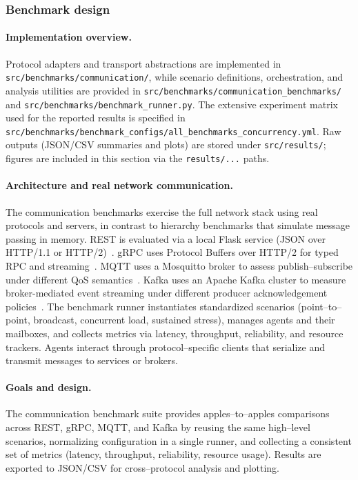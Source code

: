 \subsubsection{Benchmark design}

\paragraph{Implementation overview.}
Protocol adapters and transport abstractions are implemented in \texttt{src/benchmarks/communication/}, while scenario definitions, orchestration, and analysis utilities are provided in \texttt{src/benchmarks/communication\_benchmarks/} and \texttt{src/benchmarks/benchmark\_runner.py}. The extensive experiment matrix used for the reported results is specified in \texttt{src/benchmarks/benchmark\_configs/all\_benchmarks\_concurrency.yml}. Raw outputs (JSON/CSV summaries and plots) are stored under \texttt{src/results/}; figures are included in this section via the \texttt{results/...} paths.

\paragraph{Architecture and real network communication.}
The communication benchmarks exercise the full network stack using real protocols and servers, in contrast to hierarchy benchmarks that simulate message passing in memory. REST is evaluated via a local Flask service (JSON over HTTP/1.1 or HTTP/2)~\cite{Fielding2000REST,RFC9110}. gRPC uses Protocol Buffers over HTTP/2 for typed RPC and streaming~\cite{gRPCConcepts,gRPCProto}. MQTT uses a Mosquitto broker to assess publish--subscribe under different QoS semantics~\cite{MQTTv5Spec}. Kafka uses an Apache Kafka cluster to measure broker-mediated event streaming under different producer acknowledgement policies~\cite{apache_kafka_docs,KafkaProducerAcks}.
The benchmark runner instantiates standardized scenarios (point--to--point, broadcast, concurrent load, sustained stress), manages agents and their mailboxes, and collects metrics via latency, throughput, reliability, and resource trackers. Agents interact through protocol--specific clients that serialize and transmit messages to services or brokers.

\paragraph{Goals and design.}
The communication benchmark suite provides apples--to--apples comparisons across REST, gRPC, MQTT, and Kafka by reusing the same high--level scenarios, normalizing configuration in a single runner, and collecting a consistent set of metrics (latency, throughput, reliability, resource usage). Results are exported to JSON/CSV for cross--protocol analysis and plotting.

